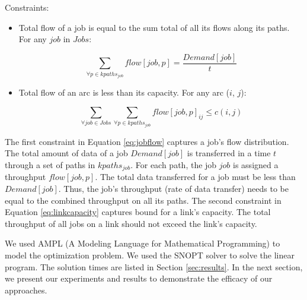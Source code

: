 Constraints:
\begin{itemize}

\item Total flow of a job is equal to the sum total of all its flows along its paths. For any $job$ in $Jobs$: 

\begin{equation} 
\label{eq:jobflow}
\sum_{\forall p \in kpaths_{job}} flow[job, p]  = \frac{Demand[job]}{t}
\end{equation}

\item Total flow of an arc is less than its capacity. For any arc ($i$, $j$):

\begin{equation} 
\label{eq:linkcapacity}
\sum_{\forall job \in Jobs}\sum_{\forall p \in kpaths_{job}} flow[job, p]_{ij} \leq c(i, j)
\end{equation}

\end{itemize}

%

The first constraint in Equation \ref{eq:jobflow} captures a job's flow distribution. The total amount of data of a job $Demand[job]$ is transferred in a time $t$ through a set of paths in $kpaths_{job}$. For each path, the job $job$ is assigned a throughput $flow[job, p]$. The total data transferred for a job must be less than $Demand[job]$. Thus, the job's throughput (rate of data transfer) needs to be equal to the combined throughput on all its paths. The second constraint in Equation \ref{eq:linkcapacity} captures bound for a link's capacity. The total throughput of all jobs on a link should not exceed the link's capacity.

We used AMPL (A Modeling Language for Mathematical Programming) \cite{ampl-book} to model the optimization problem. We used the SNOPT solver to solve the linear program. The solution times are listed in Section \ref{sec:results}. In the next section, we present our experiments and results to demonstrate the efficacy of our approaches.

